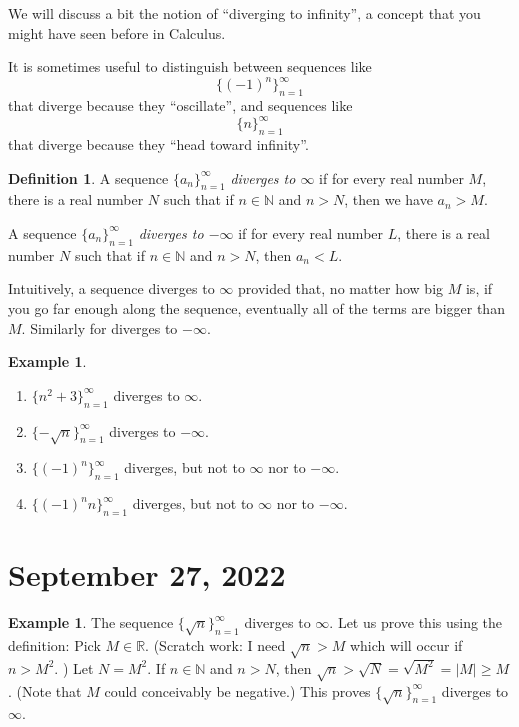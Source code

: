 \documentclass[12pt]{amsart}
\newcommand{\R}{{\mathbb{R}}}
\newcommand{\N}{\mathbb{N}}
\numberwithin{equation}{section}
\theoremstyle{plain} %
\newcommand{\Sept}[1]{\section{September #1, 2022}}
\theoremstyle{definition}
\newtheorem{defn}[equation]{Definition}
\newtheorem{ex}[equation]{Example}
\theoremstyle{remark}
\begin{document}
We will discuss a bit the notion of ``diverging to infinity'', a concept that you might have seen before in Calculus. 

It is sometimes useful to distinguish between sequences like 
$$
\{(-1)^n\}_{n=1}^\infty
$$
that diverge because they ``oscillate'', and sequences like
$$
\{n\}_{n=1}^\infty
$$
that diverge because they ``head toward infinity''.


\begin{defn} A sequence $\{a_n\}_{n=1}^\infty$ {\em diverges to $\infty$} if for every real number $M$, there is a real number $N$ such that if $n \in \N$ and  $n > N$,
	then  we have $a_n > M$.
	
	
	A sequence $\{a_n\}_{n=1}^\infty$ {\em diverges to $-\infty$} if for every real number $L$, there is a real number $N$ such that if $n \in \N$ and $n > N$,
	then $a_n < L$. 
\end{defn}

Intuitively, a sequence diverges to $\infty$ provided that, no matter how big $M$ is, if you go far enough along the sequence, eventually all of the terms are
bigger than $M$. Similarly for diverges to $-\infty$.


\begin{ex} \begin{enumerate}
\item $\{ n^2+3\}_{n=1}^\infty$ diverges to $\infty$.
\item $\{ -\sqrt{n} \}_{n=1}^\infty$ diverges to $-\infty$.
\item $\{ (-1)^n\}_{n=1}^\infty$ diverges, but not to $\infty$ nor to $-\infty$.
\item $\{(-1)^n n\}_{n=1}^\infty$ diverges, but not to $\infty$ nor to $-\infty$.
\end{enumerate}
\end{ex}



\Sept{27}


\begin{ex} The sequence $\{\sqrt{n}\}_{n=1}^\infty$ diverges to $\infty$. Let us prove this using the definition: Pick $M \in \R$. 
	(Scratch work: I need $\sqrt{n} > M$ which will occur if $n > M^2$. )
	Let $N = M^2$. 
	If $n \in \N$ and $n > N$, then $\sqrt{n} > \sqrt{N} = \sqrt{M^2} = |M| \geq M$. (Note that $M$ could conceivably be negative.)
	This proves $\{\sqrt{n}\}_{n=1}^\infty$ diverges to $\infty$.
\end{ex}
\end{document}
